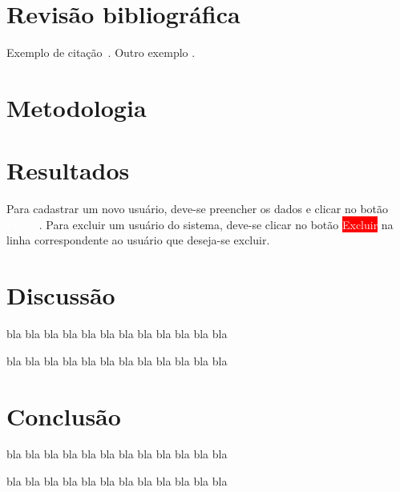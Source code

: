 \documentclass[12pt,a4paper,espaco=umemeio,noindentfirst,oneside,openany,tocpage=plain,pnumromarab,ruledheader,time,anapcustomindent]{sty/abnt}
\newcommand{\buttonblue}[1]{\colorbox{buttonblue}{\textcolor{white}{\sf\footnotesize #1}}}
\newcommand{\buttonred}[1]{\colorbox{red}{\textcolor{white}{\sf\footnotesize #1}}}
\begin{document}

\chapter{Revisão bibliográfica}

Exemplo de citação~\cite{Pressman:2006}. Outro exemplo \cite{Levy:1999}.


\chapter{Metodologia}



\chapter{Resultados}
Para cadastrar um novo usuário, deve-se preencher os dados e clicar no
botão \buttonblue{\quad Enviar\quad}. Para excluir um usuário do
sistema, deve-se clicar no botão \buttonred{\quad Excluir\quad} na
linha correspondente ao usuário que deseja-se excluir.


\chapter{Discussão}

bla bla bla bla bla bla bla bla bla bla bla bla

bla bla bla bla bla bla bla bla bla bla bla bla


\chapter{Conclusão}

bla bla bla bla bla bla bla bla bla bla bla bla

bla bla bla bla bla bla bla bla bla bla bla bla

\end{document}
